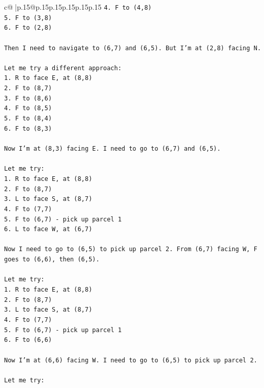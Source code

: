 \documentclass{article}
\begin{document}
{\begin{supertabular}{c@{$\;$}|p{.15\linewidth}@{}p{.15\linewidth}p{.15\linewidth}p{.15\linewidth}p{.15\linewidth}p{.15\linewidth}}
{{{\texttt{4. F to (4,8)} \\
\texttt{5. F to (3,8)} \\
\texttt{6. F to (2,8)} \\
\\ 
\texttt{Then I need to navigate to (6,7) and (6,5). But I'm at (2,8) facing N.} \\
\\ 
\texttt{Let me try a different approach:} \\
\texttt{1. R to face E, at (8,8)} \\
\texttt{2. F to (8,7)} \\
\texttt{3. F to (8,6)} \\
\texttt{4. F to (8,5)} \\
\texttt{5. F to (8,4)} \\
\texttt{6. F to (8,3)} \\
\\ 
\texttt{Now I'm at (8,3) facing E. I need to go to (6,7) and (6,5).} \\
\\ 
\texttt{Let me try:} \\
\texttt{1. R to face E, at (8,8)} \\
\texttt{2. F to (8,7)} \\
\texttt{3. L to face S, at (8,7)} \\
\texttt{4. F to (7,7)} \\
\texttt{5. F to (6,7) {-} pick up parcel 1} \\
\texttt{6. L to face W, at (6,7)} \\
\\ 
\texttt{Now I need to go to (6,5) to pick up parcel 2. From (6,7) facing W, F goes to (6,6), then (6,5).} \\
\\ 
\texttt{Let me try:} \\
\texttt{1. R to face E, at (8,8)} \\
\texttt{2. F to (8,7)} \\
\texttt{3. L to face S, at (8,7)} \\
\texttt{4. F to (7,7)} \\
\texttt{5. F to (6,7) {-} pick up parcel 1} \\
\texttt{6. F to (6,6)} \\
\\ 
\texttt{Now I'm at (6,6) facing W. I need to go to (6,5) to pick up parcel 2.} \\
\\ 
\texttt{Let me try:} \\
}}}
\end{supertabular}}
\end{document}
